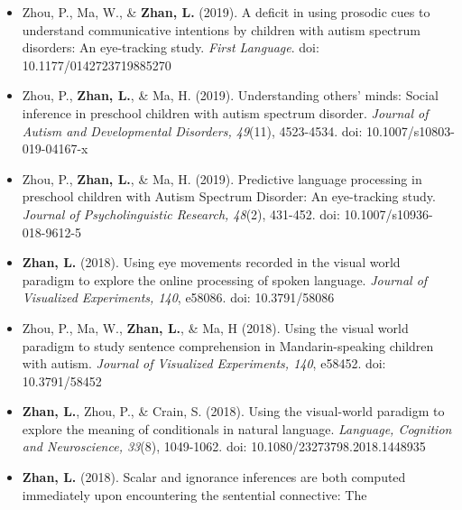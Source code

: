 \documentclass[
  12pt,
]{article}
\begin{document}
\begin{itemize}
\item
  Zhou, P., Ma, W., \& \textbf{Zhan, L.} (2019). A deficit in using
  prosodic cues to understand communicative intentions by children with
  autism spectrum disorders: An eye-tracking study. \emph{First
  Language}. doi: 10.1177/0142723719885270
  \href{https://publications.likan.info/Periodicals/FirstLang2019.pdf}{
  \faFilePdf[regular] }
\item
  Zhou, P., \textbf{Zhan, L.}, \& Ma, H. (2019). Understanding others'
  minds: Social inference in preschool children with autism spectrum
  disorder. \emph{Journal of Autism and Developmental Disorders,
  49}(11), 4523-4534. doi: 10.1007/s10803-019-04167-x
  \href{https://publications.likan.info/Periodicals/JAutismDevDisord2019.pdf}{
  \faFilePdf[regular] }
\item
  Zhou, P., \textbf{Zhan, L.}, \& Ma, H. (2019). Predictive language
  processing in preschool children with Autism Spectrum Disorder: An
  eye-tracking study. \emph{Journal of Psycholinguistic Research,
  48}(2), 431-452. doi: 10.1007/s10936-018-9612-5
  \href{https://publications.likan.info/Periodicals/JPsycholinguistRes2018.pdf}{
  \faFilePdf[regular] }
\item
  \textbf{Zhan, L.} (2018). Using eye movements recorded in the visual
  world paradigm to explore the online processing of spoken language.
  \emph{Journal of Visualized Experiments, 140}, e58086. doi:
  10.3791/58086
  \href{https://publications.likan.info/Periodicals/jove-protocol-58086.pdf}{
  \faFilePdf[regular] }
\item
  Zhou, P., Ma, W., \textbf{Zhan, L.}, \& Ma, H (2018). Using the visual
  world paradigm to study sentence comprehension in Mandarin-speaking
  children with autism. \emph{Journal of Visualized Experiments, 140},
  e58452. doi: 10.3791/58452
  \href{https://publications.likan.info/Periodicals/jove-protocol-58452.pdf}{
  \faFilePdf[regular] }
\item
  \textbf{Zhan, L.}, Zhou, P., \& Crain, S. (2018). Using the
  visual-world paradigm to explore the meaning of conditionals in
  natural language. \emph{Language, Cognition and Neuroscience, 33}(8),
  1049-1062. doi: 10.1080/23273798.2018.1448935
  \href{https://publications.likan.info/Periodicals/LangCognNeurosci2018.pdf}{
  \faFilePdf[regular] }
\item
  \textbf{Zhan, L.} (2018). Scalar and ignorance inferences are both
  computed immediately upon encountering the sentential connective: The

\end{itemize}
\end{document}
